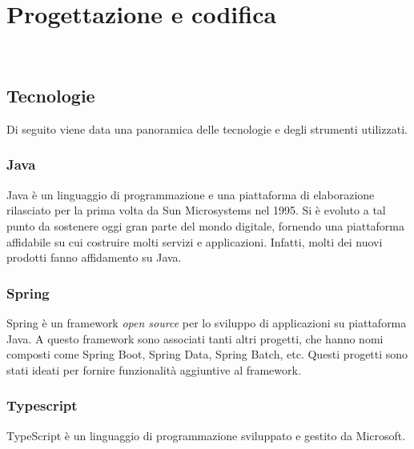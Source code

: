 
\chapter{Progettazione e codifica}
\label{cap:progettazione-codifica}

\\

\section{Tecnologie}
\label{sec:tecnologie-strumenti}

Di seguito viene data una panoramica delle tecnologie e degli strumenti
utilizzati.

\subsection*{Java}
Java è un linguaggio di programmazione e una piattaforma di elaborazione
rilasciato per la prima volta da Sun Microsystems nel 1995. Si è evoluto a tal
punto da sostenere oggi gran parte del mondo digitale, fornendo una
piattaforma affidabile su cui costruire molti servizi e applicazioni.
Infatti, molti dei nuovi prodotti fanno affidamento su Java.
\cite{site-what-is-java} \\
\subsection*{Spring}

Spring è un \gls{framework} \textit{open source} per lo sviluppo di
applicazioni su
piattaforma Java.
A questo \gls{framework} sono associati tanti altri progetti, che hanno nomi
composti come
Spring Boot, Spring Data, Spring Batch, etc. Questi progetti sono stati ideati
per
fornire funzionalità aggiuntive al \gls{framework}. \cite{site-spring}

\subsection*{Typescript}
TypeScript è un linguaggio di programmazione sviluppato e gestito da Microsoft.


